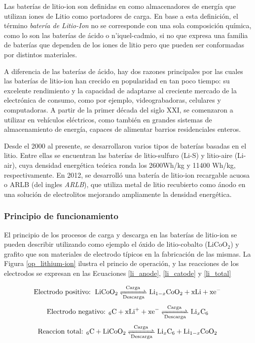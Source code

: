 \documentclass[10pt,a4paper]{article}
\newcommand\reaction[1]{\begin{equation}\ce{#1}\end{equation}}
\begin{document}
\noindent Las baterías de litio-ion son definidas en \cite{Tatsuo2014} como
almacenadores de energía que utilizan iones de Litio como portadores de carga.
En base a esta definición, el término \emph{batería de Litio-Ion} no se
corresponde con una sola composición química, como lo son las baterías de ácido
o n'iquel-cadmio, si no que expresa una familia de baterías que dependen de los
iones de litio pero que pueden ser conformadas por distintos materiales.


\noindent A diferencia de las baterías de ácido, hay dos razones principales por
las cuales las baterías de litio-ion han crecido en popularidad en tan poco
tiempo: su excelente rendimiento y la capacidad de adaptarse al creciente
mercado de la electrónica de consumo, como por ejemplo, videograbadoras,
celulares y computadoras. A partir de la primer década del siglo XXI, se
comenzaron a utilizar en vehículos eléctricos, como también en grandes sistemas
de almacenamiento de energía, capaces de alimentar barrios residenciales
enteros.

\noindent Desde el 2000 al presente, se desarrollaron varios tipos de 
bater\'ias basadas en el litio. Entre ellas se encuentran las bater\'ias de 
litio-sulfuro (Li-S) y litio-aire (Li-air), cuya densidad energética teórica 
ronda los 2600Wh/kg y 11400 Wh/kg, respectivamente. En 2012, se desarrolló una 
batería de litio-ion recargable acuosa o \acrshort{ARLB} (del ingles
\emph{\acrlong{ARLB}}), que utiliza metal de litio recubierto como ánodo en una
solución de electrolitos mejorando ampliamente la densidad energética.

\subsubsection{Principio de funcionamiento}\label{battery_fun}

El principio de los procesos de carga y descarga en las baterías de litio-ion se
pueden describir utilizando como ejemplo el óxido de litio-cobalto 
($\mathrm{LiCoO_2}$) y grafito que son materiales de electrodo t\'ipicos en la
fabricaci\'on de las mismas. La Figura \ref{op_lithium-ion} ilustra el
princio de operación, y las reacciones de los electrodos se expresan en  las
Ecuaciones \ref{li_anode}, \ref{li_catode} y \ref{li_total}

\reaction{\text{Electrodo positivo: } LiCoO2 <=>[Carga][Descarga] Li_{1-x}CoO2 + xLi + xe^- \label{li_anode}}
\reaction{\text{Electrodo negativo: }6C + xLi^+ + xe^- <=>[Carga][Descarga] Li_{x}C6 \label{li_catode}}
\reaction{\text{Reaccion total: }6C + LiCoO2 <=>[Carga][Descarga] Li_{x}C6 + Li_{1-x}CoO2 \label{li_total}}
\end{document}
